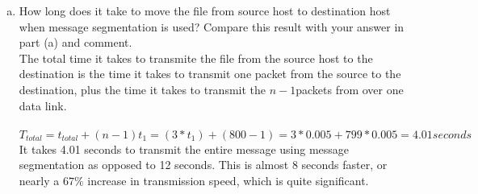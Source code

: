 \documentclass[11pt]{article}
\begin{document}
\begin{enumerate}[a.]
    \item How long does it take to move the file from source host to destination host when message segmentation is used? Compare this result with your answer in part (a) and comment.\\
    The total time it takes to transmite the file from the source host to the destination is the time it takes to transmit one packet from the source to the destination, plus the time it takes to transmit the $n-1$packets from over one data link.\\\\
    $T_{total}=t_{total}+(n-1)t_1=(3*t_1)+(800-1)=3*0.005+799*0.005=4.01 seconds$\\
    It takes 4.01 seconds to transmit the entire message using message segmentation as opposed to 12 seconds. This is almost 8 seconds faster, or nearly a $67\%$ increase in transmission speed, which is quite significant.
\end{enumerate}
\end{document}

